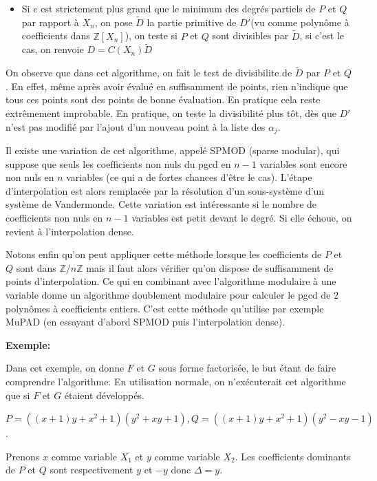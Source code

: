 \documentclass[a4paper,11pt]{article}
\begin{document}
\begin{giacjshere}
\begin{enumerate}
\begin{itemize}
\begin{itemize}
      \item Si $e$ est strictement plus grand que le minimum des degrés
      partiels de $P$ et $Q$ par rapport à $X_n$, on pose $\tilde{D}$ la
      partie primitive de $D' $(vu comme polynôme à coefficients dans
      $\mathbb{Z} [ X_n ]$), on teste si $P$ et $Q$ sont divisibles par
      $\tilde{D}$, si c'est le cas, on renvoie $D = C ( X_n ) \tilde{D}$
    \end{itemize}
  \end{itemize}
\end{enumerate}
On observe que dans cet algorithme, on fait le test de divisibilite de
$\tilde{D}$ par $P$ et $Q$. En effet, même après avoir évalué en suffisamment
de points, rien n'indique que tous ces points sont des points de bonne
évaluation. En pratique cela reste extrêmement improbable. En pratique, on
teste la divisibilité plus tôt, dès que $D'$ n'est pas modifié par l'ajout
d'un nouveau point à la liste des $\alpha_j$.

Il existe une variation de cet algorithme, appelé SPMOD (sparse modular), qui
suppose que seuls les coefficients non nuls du pgcd en $n - 1$ variables sont
encore non nuls en $n$ variables (ce qui a de fortes chances d'être le cas).
L'étape d'interpolation est alors remplacée par la résolution d'un
sous-système d'un système de Vandermonde. Cette variation est intéressante si
le nombre de coefficients non nuls en $n - 1$ variables est petit devant le
degré. Si elle échoue, on revient à l'interpolation dense.

Notons enfin qu'on peut appliquer cette méthode lorsque les coefficients de
$P$ et $Q$ sont dans $\mathbb{Z} / n \mathbb{Z}$ mais il faut alors vérifier
qu'on dispose de suffisamment de points d'interpolation. Ce qui en combinant
avec l'algorithme modulaire à une variable donne un algorithme doublement
modulaire pour calculer le pgcd de 2 polynômes à coefficients entiers. C'est
cette méthode qu'utilise par exemple MuPAD (en essayant d'abord SPMOD puis
l'interpolation dense).

{\bf{Exemple:}}

Dans cet exemple, on donne $F$ et $G$ sous forme factorisée, le but étant de
faire comprendre l'algorithme. En utilisation normale, on n'exécuterait cet
algorithme que si $F$ et $G$ étaient développés.

$P = (( x + 1 ) y + x^2 + 1 ) ( y^2 + x y + 1 ), Q = (( x + 1 ) y +
x^2 + 1 ) ( y^2 - x y - 1 )$.

Prenons $x$ comme variable $X_1$ et $y$ comme variable $X_2$. Les coefficients
dominants de $P$ et $Q$ sont respectivement $y$ et $- y$ donc $\Delta = y$.


\end{giacjshere}
\end{document}
